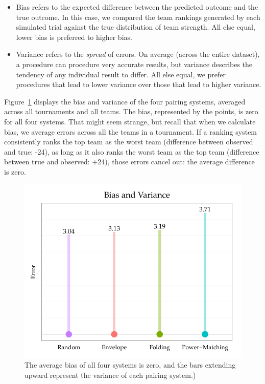 \documentclass{tufte-handout}
\begin{document}
\begin{itemize}
\item Bias refers to the expected difference between the predicted outcome and the true outcome. In this case, we compared the team rankings generated by each simulated trial against the true distribution of team strength. All else equal, lower bias is preferred to higher bias. 
\item  Variance refers to the \emph{spread} of errors. On average (across the entire dataset), a procedure can procedure very accurate results, but variance describes the tendency of any individual result to differ. All else equal, we prefer procedures that lead to lower variance over those that lead to higher variance.
\end{itemize}

Figure~\ref{fig:bias_var} displays the bias and variance of the four pairing systems, averaged across all tournaments and all teams. The bias, represented by the points, is zero for all four systems. That might seem strange, but recall that when we calculate bias, we average errors across all the teams in a tournament. If a ranking system consistently ranks the top team as the worst team (difference between observed and true: -24), as long as it also ranks the worst team as the top team (difference between true and observed: +24), those errors cancel out: the average difference is zero.  
\begin{figure}
  \includegraphics[width=0.7\linewidth]{error_bar.pdf}
  \caption{The average bias of all four systems is zero, and the bars extending upward represent the variance of each pairing system.)}
  \label{fig:bias_var}
\end{figure}
\end{document}
